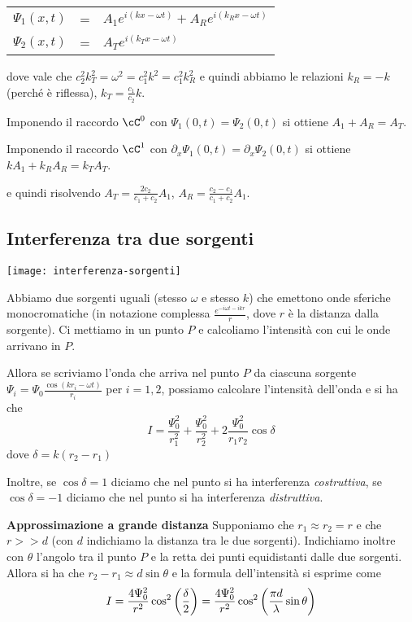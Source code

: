 \documentclass[10pt,a4paper]{article}
\begin{document}
\begin{multicols}{2}
  \begin{tabular}{lcl}
    $\Psi_1(x, t)$ & = & $A_1 e^{i(kx - \omega t)} + A_R e^{i(k_R x - \omega t)}$ \\
    $\Psi_2(x, t)$ & = & $A_T e^{i(k_T x - \omega t)}$                            \\
  \end{tabular}

  dove vale che $c_2^2 k_T^2 = \omega^2 = c_1^2 k^2 = c_1^2 k_R^2$ e quindi abbiamo le relazioni $k_R = - k$ (perché è riflessa), $k_T = \frac{c_1}{c_2} k$.

  Imponendo il raccordo $\cC^0$ con $\Psi_1(0, t) = \Psi_2(0, t)$ si ottiene $A_1 + A_R = A_T$.
  
  Imponendo il raccordo $\cC^1$ con $\partial_x \Psi_1(0, t) = \partial_x \Psi_2(0, t)$ si ottiene $k A_1 + k_R A_R = k_T A_T$.

  e quindi risolvendo $A_T = \frac{2 c_2}{c_1 + c_2} A_1$, $A_R = \frac{c_2 - c_1}{c_1 + c_2} A_1$.                      

  \subsection*{Interferenza tra due sorgenti}
  \begin{center}
    \texttt{[image: interferenza-sorgenti]}
  \end{center}

  \begin{paragrafo}
    Abbiamo due sorgenti uguali (stesso $\omega$ e stesso $k$) che emettono onde sferiche monocromatiche (in notazione complessa $\frac{e^{-i\omega t - ikr}}{r}$, dove $r$ è la distanza dalla sorgente). Ci mettiamo in un punto $P$ e calcoliamo l'intensità con cui le onde arrivano in $P$.
  \end{paragrafo}

  Allora se scriviamo l'onda che arriva nel punto $P$ da ciascuna sorgente $\Psi_i = \Psi_0 \frac{\cos(k r_i - \omega t)}{r_i}$ per $i = 1, 2$, possiamo calcolare l'intensità dell'onda e si ha che
  $$ I = \frac{\Psi_0^2}{r_1^2} + \frac{\Psi_0^2}{r_2^2} + 2 \frac{\Psi_0^2}{r_1 r_2} \cos \delta $$
  dove $\delta = k (r_2 - r_1)$

  Inoltre, se $\cos \delta = 1$ diciamo che nel punto si ha interferenza {\it costruttiva}, se $\cos \delta = -1$ diciamo che nel punto si ha interferenza {\it distruttiva}.

  {\bf Approssimazione a grande distanza}
  Supponiamo che $r_1 \approx r_2 = r$ e che $r >> d$ (con $d$ indichiamo la distanza tra le due sorgenti). Indichiamo inoltre con $\theta$ l'angolo tra il punto $P$ e la retta dei punti equidistanti dalle due sorgenti. Allora si ha che $r_2 - r_1 \approx d \sin\theta$ e la formula dell'intensità si esprime come
  $$ I = \frac{4 \Psi_0^2}{r^2} \cos^2 \left({\frac{\delta}{2}}\right) = \frac{4 \Psi_0^2}{r^2} \cos^2 \left({\frac{\pi d}{\lambda} \sin\theta}\right) $$


\end{multicols}
\end{document}

